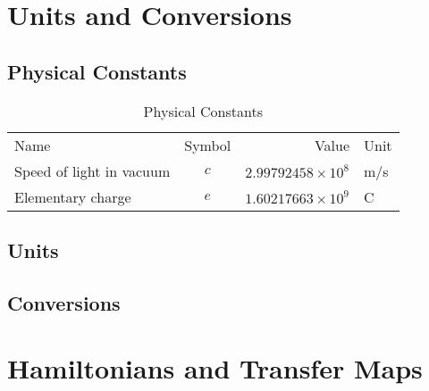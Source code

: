 \appendix  %


\chapter{Units and Conversions}
\thumbforappendix


\section{Physical Constants}

\begin{table}[H]
    \centering
    \begin{tabular}{lcrl}
    Name                        &    Symbol     &    Value                        &     Unit      \\
    Speed of light in vacuum    &     $c$       &   $2.99792458 \times 10^8$      &      m/s      \\
    Elementary charge           &     $e$       &   $1.60217663 \times 10^9$      &       C       \\
        
    \end{tabular}
    \caption{Physical Constants}
    \label{table:appendix:physical_constants}
\end{table}


\section{Units}


\section{Conversions}


\chapter{Hamiltonians and Transfer Maps}
\label{appendix:transfer_maps}
\thumbforappendix


